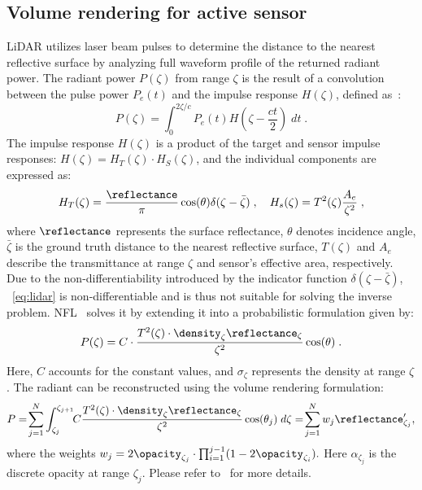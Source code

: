 \subsection{Volume rendering for active sensor} \label{sec:vol_render_background}
LiDAR utilizes laser beam pulses to determine the distance to the nearest reflective surface by analyzing full waveform profile of the returned radiant power. The radiant power $P(\zeta)$ from range $\zeta$ is the result of a convolution between the pulse power $P_e(t)$ and the impulse response $H(\zeta)$, defined as~\cite{hahner2021fog,hahner2022lidar,Huang2023nfl}:
\begin{equation}
    P(\zeta) = \int_0^{2\zeta/c} P_e(t) H(\zeta - \frac{ct}{2}) \; dt\;.
\label{eq:lidar}
\end{equation}
The impulse response $H(\zeta)$ is a product of the target and sensor impulse responses: $H(\zeta) = H_T(\zeta)\cdot H_S(\zeta)$, and the individual components are expressed as:
\begin{equation}
    H_T(\zeta) = \frac{\reflectance}{\pi} \cos(\theta) \delta(\zeta - \bar{\zeta})\;, \quad  H_s(\zeta) = T^2(\zeta) \frac{A_e}{\zeta^2}\;,
\label{eq:ht}
\end{equation}
where $\reflectance$ represents the surface reflectance, $\theta$ denotes incidence angle, $\bar{\zeta}$ is the ground truth distance to the nearest reflective surface, $T(\zeta)$ and $A_e$ describe the transmittance at range $\zeta$ and sensor's effective area, respectively. Due to the non-differentiability introduced by the indicator function $\delta(\zeta - \bar{\zeta})$, ~\cref{eq:lidar} is non-differentiable and is thus not suitable for solving the inverse problem. NFL~\cite{Huang2023nfl} solves it by extending it into a probabilistic formulation given by:
\begin{equation}
P(\zeta) = C \cdot \frac{T^2(\zeta) \cdot \density_\zeta  \reflectance_\zeta}{\zeta^2} \cos(\theta)\;.
\label{eq:radiance}
\end{equation}
Here, $C$ accounts for the constant values, and $\sigma_\zeta$ represents the density at range $\zeta$. The radiant can be reconstructed using the volume rendering formulation:
\begin{equation}
      P
      =\!\sum_{j=1}^N \int_{\zeta_j}^{\zeta_{j+1}}\!\!C \frac{T^2({\zeta}) \cdot \density_\zeta \reflectance_\zeta}{\zeta^2} \cos(\theta_j) \; d\zeta
      =\!\sum_{j=1}^N w_j \reflectance_{\zeta_j}',
\label{eq:radiant_inter}
\end{equation}
where the weights $w_j = 2 \opacity_{\zeta_j} \cdot\prod_{i=1}^{j-1}(1 - 2 \opacity_{\zeta_i}).$
Here $\alpha_{\zeta_j}$ is the discrete opacity at range $\zeta_j$. Please refer to~\cite{Huang2023nfl} for more details.


